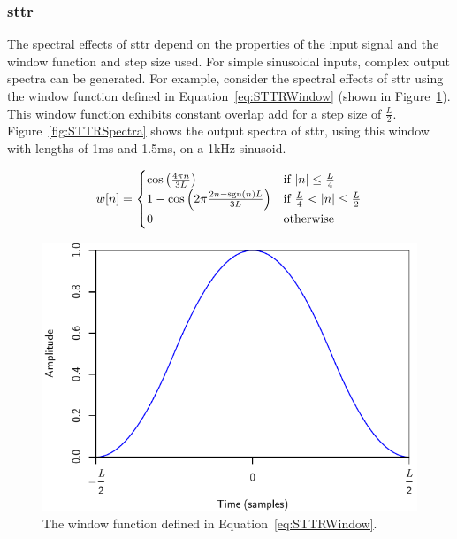 		\subsubsection*{\acrshort{sttr}}
			The spectral effects of \acrshort{sttr} depend on the properties of the input signal and the
			window function and step size used. For simple sinusoidal inputs, complex output spectra can be
			generated. For example, consider the spectral effects of \acrshort{sttr} using the window function
			defined in Equation~\ref{eq:STTRWindow} (shown in Figure~\ref{fig:STTRWindow}). This window
			function exhibits constant overlap add for a step size of $\frac{L}{2}$.
			Figure~\ref{fig:STTRSpectra} shows the output spectra of \acrshort{sttr}, using this window with
			lengths of 1ms and 1.5ms, on a 1kHz sinusoid.

			\begin{equation}
				w[n] = \begin{cases}
					\cos \left( \frac{4\pi n}{3L} \right) & \text{if $\left|n\right| \leq \frac{L}{4} $} \\
					1 - \cos \left( 2\pi \frac{2n - \operatorname{sgn}(n)L}{3L} \right) &
						\text{if $\frac{L}{4} < \left|n\right| \leq \frac{L}{2}$} \\
					0 & \text{otherwise}
				\end{cases}
				\label{eq:STTRWindow}
			\end{equation}

			\begin{figure}[h!]
				\centering
				\includegraphics{chapter5/Images/STTRWindow.pdf}
				\caption{The window function defined in Equation~\ref{eq:STTRWindow}.}
				\label{fig:STTRWindow}
			\end{figure}

